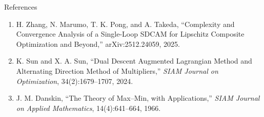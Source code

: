 \documentclass[handout,compress,9pt]{beamer}
\newcommand{\blue}[1]{\textcolor{ddlblue}{#1}}
\newcommand{\bx}{\bm{x}}
\begin{document}




\begin{frame}{References}
\footnotesize
\begin{enumerate}
  \item[{[1]}] H. Zhang, N. Marumo, T. K. Pong, and A. Takeda,
  ``Complexity and Convergence Analysis of a Single-Loop SDCAM for
  Lipschitz Composite Optimization and Beyond,'' arXiv:2512.24059, 2025.

  \item[{[2]}] K. Sun and X. A. Sun,
  ``Dual Descent Augmented Lagrangian Method and Alternating Direction
  Method of Multipliers,'' \emph{SIAM Journal on Optimization},
  34(2):1679--1707, 2024.

  \item[{[3]}] J. M. Danskin,
  ``The Theory of Max--Min, with Applications,''
  \emph{SIAM Journal on Applied Mathematics},
  14(4):641--664, 1966.
\end{enumerate}
\end{frame}

\appendix
\end{document}

